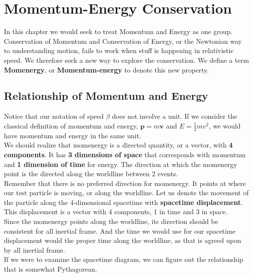 \documentclass[12pt]{book}
\begin{document}
\newpage

\section{Momentum-Energy Conservation}
In this chapter we would seek to treat Momentum and Energy as one group. Conservation of Momentum and Conservation of Energy, or the Newtonian way to understanding motion, fails to work when stuff is happening in relativistic speed. We therefore seek a new way to explore the conservation. We define a term \textbf{Momenergy}, or \textbf{Momentum-energy} to denote this new property.
\subsection{Relationship of Momentum and Energy}
Notice that our notation of speed $\beta$ does not involve a unit. If we consider the classical definition of momentum and energy, $\textbf{p}=m\textbf{v}$ and $E = \frac{1}{2}mv^2$, we would have momentum and energy in the same unit. \\
\newline
We should realize that momenergy is a directed quantity, or a vector, with \textbf{4 components}. It has \textbf{3 dimensions of space} that corresponds with momentum and \textbf{1 dimension of time} for energy. The direction at which the momenergy point is the directed along the worldline between 2 events.\\
\newline
Remember that there is no preferred direction for momenergy. It points at where our test particle is moving, or along the worldline. Let us denote the movement of the particle along the 4-dimensional spacetime with \textbf{spacetime displacement}. This displacement is a vector with 4 components, 1 in time and 3 in space. \\
\newline
Since the momenergy points along the worldline, its direction should be consistent for all inertial frame. And the time we would use for our spacetime displacement would the proper time along the worldline, as that is agreed upon by all inertial frame.\\
\newline
If we were to examine the spacetime diagram, we can figure out the relationship that is somewhat Pythagorean.\\
\end{document}
